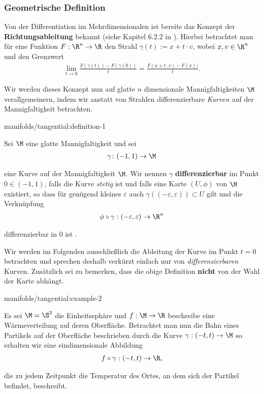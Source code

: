 \documentclass[letterpaper,10pt,german]{jupyterBook}
\begin{document}
\subsubsection{Geometrische Definition}
\label{\detokenize{manifolds/tangential:geometrische-definition}}
\par
Von der Differentiation im Mehrdimensionalen ist bereits das Konzept der \textbf{Richtungsableitung} bekannt (siehe Kapitel 6.2.2 in \cite{Ten21}).
Hierbei betrachtet man für eine Funktion \(F:\R^n\to\R\) den Strahl \(\gamma(t):= x + t\cdot v\), wobei \(x,v\in\R^n\) und den Grenzwert
\begin{align*}
\lim_{t\to 0} \frac{F(\gamma(t)) - F(\gamma(0))}{t} = \frac{F(x + t\cdot v) - F(x))}{t}.
\end{align*}
\par
Wir werden dieses Konzept nun auf glatte \(n\) dimensionale Mannigfaltigkeiten \(\M\) verallgemeinern, indem wir anstatt von Strahlen differenzierbare \emph{Kurven} auf der Mannigfaltigkeit betrachten.
\begin{definition}{}{manifolds/tangential:definition-1}



\par
Sei \(\M\) eine glatte Mannigfaltigkeit und sei
\begin{align*}
\gamma \colon (-1,1) \rightarrow \M
\end{align*}
\par
eine Kurve auf der Mannigfaltigkeit \(\M\).
Wir nennen \(\gamma\) \textbf{differenzierbar} im Punkt \(0\in(-1,1)\), falls die Kurve \emph{stetig} ist und falls eine Karte \((U,\phi)\) von \(\M\) existiert, so dass für genügend kleines \(\varepsilon\) auch \(\gamma((-\varepsilon,\varepsilon))\subset U\) gilt und die Verknüpfung
\begin{align*}
\phi \circ \gamma:(-\varepsilon,\varepsilon)\to\R^n
\end{align*}
\par
differenzierbar in \(0\) ist .
\end{definition}

\par
Wir werden im Folgenden ausschließlich die Ableitung der Kurve im Punkt \(t=0\) betrachten und sprechen deshalb verkürzt einfach nur von \emph{differenzierbaren} Kurven.
Zusätzlich sei zu bemerken, dass die obige Definition \textbf{nicht} von der Wahl der Karte abhängt.
\begin{example}{}{manifolds/tangential:example-2}



\par
Es sei \(\M=\S^2\) die Einheitssphäre und \(f:\M\to\R\) beschreibe eine Wärmeverteilung auf deren Oberfläche.
Betrachtet man nun die Bahn eines Partikels auf der Oberfläche beschrieben durch die Kurve \(\gamma:(-t, t)\to \M\) so erhalten wir eine eindimensionale Abbildung
\begin{align*}
f\circ\gamma:(-t,t)\to \R,
\end{align*}
\par
die zu jedem Zeitpunkt die Temperatur des Ortes, an dem sich der Partikel befindet, beschreibt.
\end{example}
\end{document}
